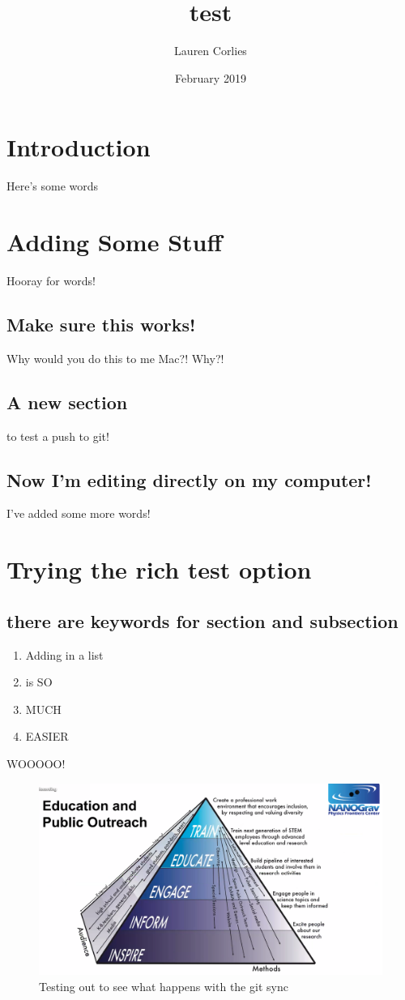 \documentclass{article}
\title{test}
\author{Lauren Corlies}
\date{February 2019}
\begin{document}
\maketitle

\section{Introduction}
Here's some words

\section{Adding Some Stuff}
Hooray for words!

\subsection{Make sure this works!}
Why would you do this to me Mac?! Why?!

\subsection{A new section}
to test a push to git!

\subsection{Now I'm editing directly on my computer!}
I've added some more words!

\section{Trying the rich test option}
\subsection{there are keywords for section and subsection}
\begin{enumerate}
\item Adding in a list
\item is SO 
\item MUCH
\item EASIER
\end{enumerate}

WOOOOO!

\begin{figure}
    \centering
    \includegraphics[width=1.0\textwidth]{first_figure.png}
    \caption{Testing out to see what happens with the git sync}
    \label{fig:first}
\end{figure}
\end{document}
